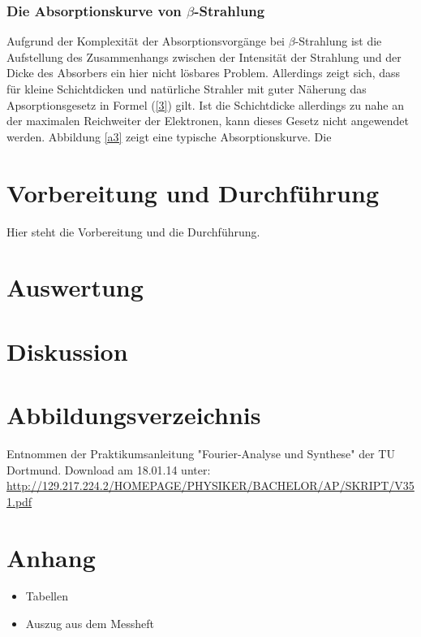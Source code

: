 \documentclass[11pt,ngerman,a4paper]{article}
\begin{document}
\subsubsection{Die Absorptionskurve von $\beta$-Strahlung}
Aufgrund der Komplexität der Absorptionsvorgänge bei $\beta$-Strahlung ist die Aufstellung des Zusammenhangs zwischen der Intensität der Strahlung und der Dicke des Absorbers ein hier nicht lösbares Problem. Allerdings zeigt sich, dass für kleine Schichtdicken und natürliche Strahler mit guter Näherung das Apsorptionsgesetz in Formel (\ref{3}) gilt. Ist die Schichtdicke allerdings zu nahe an der maximalen Reichweiter der Elektronen, kann dieses Gesetz nicht angewendet werden. Abbildung \ref{a3} zeigt eine typische Absorptionskurve. Die 
\section{Vorbereitung und Durchf\"{u}hrung}
Hier steht die Vorbereitung und die Durchführung.

\section{Auswertung}

\section{Diskussion}

\section{Abbildungsverzeichnis}
\begin{enumerate}[{[}1{]}]
\item Entnommen der Praktikumsanleitung "Fourier-Analyse und Synthese" der TU Dortmund. Download am 18.01.14 unter:\\
 \url{http://129.217.224.2/HOMEPAGE/PHYSIKER/BACHELOR/AP/SKRIPT/V351.pdf}
\end{enumerate}
\section{Anhang}
\begin{itemize}
\item Tabellen
\item Auszug aus dem Messheft
\end{itemize}
\end{document}
